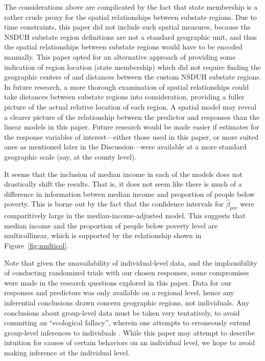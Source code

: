 \documentclass{article}
\begin{document}
The considerations above are complicated by the fact that
state membership is a rather crude proxy for the spatial relationships
between substate regions.
Due to time constraints, this paper did not include such spatial measures,
because the NSDUH substate region definitions
are not a standard geographic unit,
and thus the spatial relationships between substate regions
would have to be encoded manually.
This paper opted for an alternative approach of
providing some indication of region location (state membership)
which did not require finding the geographic centers of
and distances between the custom NSDUH substate regions.
In future research,
a more thorough examination of spatial relationships
could take distances between substate regions into consideration,
providing a fuller picture of the actual relative location
of each region.
A spatial model may reveal a clearer picture of the relationship
between the predictor and responses
than the linear models in this paper.
Future research would be made easier if estimates for
the response variables of interest---either those
used in this paper, or more suited ones as mentioned
later in the Discussion---were available
at a more standard geographic scale
(say, at the county level).

It seems that the inclusion of median income in each
of the models does not drastically shift the results.
That is, it does not seem like there is much of a difference
in information betwen median income and proportion of people
below poverty.
This is borne out by the fact that the confidence intervals
for $\hat{\beta}_{pov}$ were comparitively large in the
median-income-adjusted model.
This suggests that median income and the proportion of
people below poverty level are multicollinear,
which is supported by the relationship shown
in Figure~\ref{fig:multicol}.

Note that given the unavailability of individual-level data,
and the implausibility of conducting randomized trials with our chosen responses,
some compromises were made in the research questions explored in this paper.
Data for our responses and predictors was only available on a regional level,
hence any inferential conclusions drawn
concern geographic regions, not individuals.
Any conclusions about group-level data must be taken very tentatively,
to avoid commiting an ``ecological fallacy'',
wherein one attempts to erroneously extend group-level inferences
to individuals
\cite{piantadosi_1988}.
While this paper may attempt to describe
intuition for causes of certain behaviors on an individual
level, we hope to avoid making inference at the individual level.
\end{document}
